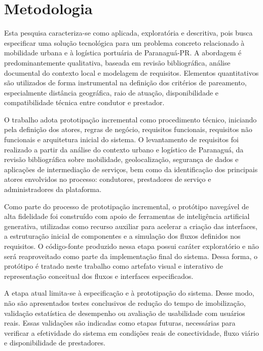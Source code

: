 \documentclass[12pt, a4paper]{article}
\begin{document}
\section{Metodologia}
Esta pesquisa caracteriza-se como aplicada, exploratória e descritiva, pois busca especificar uma solução tecnológica para um problema concreto relacionado à mobilidade urbana e à logística portuária de Paranaguá-PR. A abordagem é predominantemente qualitativa, baseada em revisão bibliográfica, análise documental do contexto local e modelagem de requisitos. Elementos quantitativos são utilizados de forma instrumental na definição dos critérios de pareamento, especialmente distância geográfica, raio de atuação, disponibilidade e compatibilidade técnica entre condutor e prestador.

O trabalho adota prototipação incremental como procedimento técnico, iniciando pela definição dos atores, regras de negócio, requisitos funcionais, requisitos não funcionais e arquitetura inicial do sistema. O levantamento de requisitos foi realizado a partir da análise do contexto urbano e logístico de Paranaguá, da revisão bibliográfica sobre mobilidade, geolocalização, segurança de dados e aplicações de intermediação de serviços, bem como da identificação dos principais atores envolvidos no processo: condutores, prestadores de serviço e administradores da plataforma.

Como parte do processo de prototipação incremental, o protótipo navegável de alta fidelidade foi construído com apoio de ferramentas de inteligência artificial generativa, utilizadas como recurso auxiliar para acelerar a criação das interfaces, a estruturação inicial de componentes e a simulação dos fluxos definidos nos requisitos. O código-fonte produzido nessa etapa possui caráter exploratório e não será reaproveitado como parte da implementação final do sistema. Dessa forma, o protótipo é tratado neste trabalho como artefato visual e interativo de representação conceitual dos fluxos e interfaces especificados.

A etapa atual limita-se à especificação e à prototipação do sistema. Desse modo, não são apresentados testes conclusivos de redução do tempo de imobilização, validação estatística de desempenho ou avaliação de usabilidade com usuários reais. Essas validações são indicadas como etapas futuras, necessárias para verificar a efetividade do sistema em condições reais de conectividade, fluxo viário e disponibilidade de prestadores.
\end{document}
